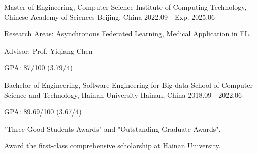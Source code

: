 

\begin{cventries}

\cventry
{Master of Engineering, Computer Science} %
{Institute of Computing Technology, Chinese Academy of Sciences} %
{Beijing, China} %
{2022.09 - Exp. 2025.06} %
{
  \begin{cvitems} %
    \item {Research Areas: Asynchronous Federated Learning, Medical Application in FL.}
    \item {Advisor: Prof. Yiqiang Chen}
    \item {GPA: 87/100 (3.79/4)}
  \end{cvitems}
}


\cventry
{Bachelor of Engineering, Software Engineering for Big data} %
{School of Computer Science and Technology, Hainan University} %
{Hainan, China} %
{2018.09 - 2022.06} %
{
  \begin{cvitems} %
    \item {GPA: 89.69/100 (3.67/4)}
    \item {"Three Good Students Awards" and "Outstanding Graduate  Awards".}
    \item {Award the first-class comprehensive scholarship at Hainan University.}
  \end{cvitems}
}

\end{cventries}
